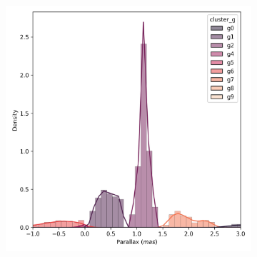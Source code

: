 \documentclass[11pt,a4paper,english,twocolumn]{article}
\begin{document}
\begin{figure}[!hbt]
\begin{subfigure}{0.3\textwidth}
  \end{subfigure}
  \begin{subfigure}{0.3\textwidth}
    \includegraphics[width=\textwidth]{../figures/ngc_2682/dec_parallax_filtered_ngc_2682.png}
  \end{subfigure}


\end{figure}
\end{document}
